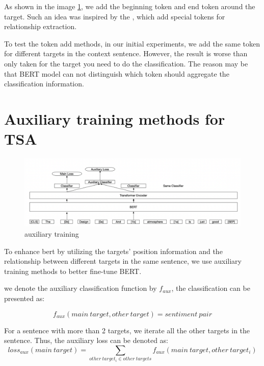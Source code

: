 \documentclass[fyp]{socreport}
\begin{document}

As shown in the image \ref{Framework}, we add the beginning token and end token around the target. Such an idea was inspired by the \cite{soares2019matching}, which add special tokens for relationship extraction.

To test the token add methods, in our initial experiments, we add the same token for different targets in the context sentence. However, the result is worse than only taken for the target you need to do the classification. The reason may be that BERT model can not distinguish which token should aggregate the classification information.





\section{Auxiliary training methods for TSA}

\begin{figure}[h]
    \centering
    \includegraphics[width=\linewidth]{./image/aux.png}
    \caption{auxiliary training}
  \label{Framework}
\end{figure}


To enhance bert by utilizing the targets' position information and the relationship between different targets in the same sentence, we use auxiliary training methods to better fine-tune BERT.

we denote the auxiliary classification function by $f_{aux}$, the classification can be presented as:  

\begin{equation}
    f_{aux}(main\ target,other\ {target})=sentiment\ {pair}
\end{equation}

For a sentence with more than 2 targets, we iterate all the other targets in the sentence. Thus, the auxiliary loss can be denoted as:  
\begin{equation}
    loss_{aux}(main\ target)=\sum_{other\ {target_i} \in other\ {targets} }f_{aux}(main\ target,other\ {target_i})
\end{equation}
\end{document}
